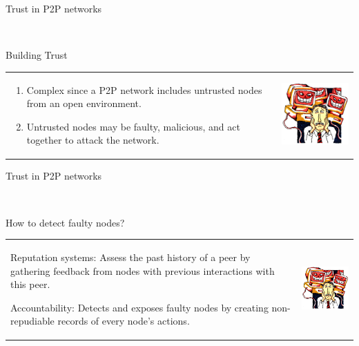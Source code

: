 \documentclass[12pt]{beamer}
\renewcommand{\frametitle}[1]{\vspace{0.2cm}\begin{huge}#1\end{huge}}
\renewcommand{\framesubtitle}[1]{\\ \vspace{0.4cm} \hspace{0.4cm}\begin{large}#1\end{large}}
\begin{document}
  \begin{frame}
  \frametitle{Trust in P2P networks}
  \framesubtitle{Building Trust}
  \begin{table}
  \begin{tabular}{p{7cm}p{3cm}}
  \begin{enumerate}
      \item Complex since a P2P network includes untrusted nodes from an open environment.
      \item Untrusted nodes may be faulty, malicious, and act together to attack the network.
  \end{enumerate}
  &
  \vspace{1.5cm}
  \includegraphics[width=4cm]{../../presentacion/img/malicious}\\
  \end{tabular}
  \end{table}
  \end{frame}
  
  \begin{frame}
  \frametitle{Trust in P2P networks}
  \framesubtitle{How to detect faulty nodes?}
  \begin{table}
  \begin{tabular}{p{7cm}p{3cm}}
  \begin{description}
      \item{Reputation systems:} Assess the past history of a
  peer by gathering feedback from nodes with previous interactions with this
  peer.
      \item{Accountability:} Detects and exposes faulty nodes by
  creating non-repudiable records of every node’s actions.
  \end{description}
  &
  \vspace{1.5cm}
  \includegraphics[width=4cm]{../../presentacion/img/malicious}\\
  \end{tabular}
  \end{table}
  \end{frame}
  
\end{document}
